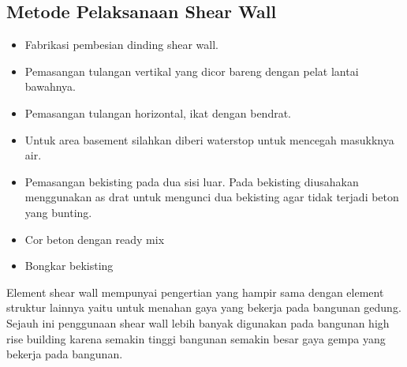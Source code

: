 \documentclass[../modul_skb.tex]{subfiles}
\begin{document}
\subsection{Metode Pelaksanaan Shear Wall}%
\label{sub:Metode Pelaksanaan Shear Wall}

\begin{itemize}
	\item Fabrikasi pembesian dinding shear wall.
	\item Pemasangan tulangan vertikal yang dicor bareng dengan pelat lantai bawahnya.
	\item Pemasangan tulangan horizontal, ikat dengan bendrat.
	\item Untuk area basement silahkan diberi waterstop untuk mencegah masukknya air.
	\item Pemasangan bekisting pada dua sisi luar. Pada bekisting diusahakan menggunakan as drat untuk mengunci dua bekisting agar tidak terjadi beton yang bunting.
	\item Cor beton dengan ready mix
	\item Bongkar bekisting
\end{itemize}

Element shear wall mempunyai pengertian yang hampir sama dengan element struktur lainnya yaitu untuk menahan gaya yang bekerja pada bangunan gedung. Sejauh ini penggunaan shear wall lebih banyak digunakan pada bangunan high rise building karena semakin tinggi bangunan semakin besar gaya gempa yang bekerja pada bangunan.








\end{document}
